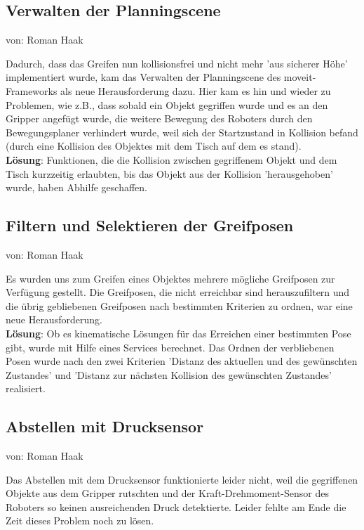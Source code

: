 \documentclass{suturo}
\makeatletter
\newcommand{\chapterauthor}[1]{%
  {\parindent0pt\vspace*{-27pt}%
  \linespread{0}\small\begin{flushright}von: #1\end{flushright}%
  \par\nobreak\vspace*{0pt}}
  \@afterheading%
}
\makeatother
\begin{document}
\subsection{Verwalten der Planningscene}
\chapterauthor{Roman Haak}
Dadurch, dass das Greifen nun kollisionsfrei und nicht mehr 'aus sicherer Höhe' implementiert wurde, kam das Verwalten der Planningscene des moveit-Frameworks als neue Herausforderung dazu. Hier kam es hin und wieder zu Problemen, wie z.B., dass sobald ein Objekt gegriffen wurde und es an den Gripper angefügt wurde, die weitere Bewegung des Roboters durch den Bewegungsplaner verhindert wurde, weil sich der Startzustand in Kollision befand (durch eine Kollision des Objektes mit dem Tisch auf dem es stand).\\
\textbf{Lösung}: Funktionen, die die Kollision zwischen gegriffenem Objekt und dem Tisch kurzzeitig erlaubten, bis das Objekt aus der Kollision 'herausgehoben' wurde, haben Abhilfe geschaffen.

\subsection{Filtern und Selektieren der Greifposen}
\chapterauthor{Roman Haak}
Es wurden uns zum Greifen eines Objektes mehrere mögliche Greifposen zur Verfügung gestellt. Die Greifposen, die nicht erreichbar sind herauszufiltern und die übrig gebliebenen Greifposen nach bestimmten Kriterien zu ordnen, war eine neue Herausforderung.\\
\textbf{Lösung}: Ob es kinematische Lösungen für das Erreichen einer bestimmten Pose gibt, wurde mit Hilfe eines Services berechnet. Das Ordnen der verbliebenen Posen wurde nach den zwei Kriterien 'Distanz des aktuellen und des gewünschten Zustandes' und 'Distanz zur nächsten Kollision des gewünschten Zustandes' realisiert.

\subsection{Abstellen mit Drucksensor}
\chapterauthor{Roman Haak}
Das Abstellen mit dem Drucksensor funktionierte leider nicht, weil die gegriffenen Objekte aus dem Gripper rutschten und der Kraft-Drehmoment-Sensor des Roboters so keinen ausreichenden Druck detektierte. Leider fehlte am Ende die Zeit dieses Problem noch zu lösen.
\end{document}
